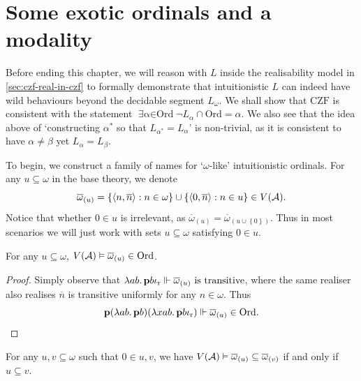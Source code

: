 \documentclass[12pt,openany]{book}
\theoremstyle{plain}
\theoremstyle{definition}
\newcommand\tuple[1]{\left\langle #1 \right\rangle}
\newcommand\opE[1]{\mathop{\exists #1}}
\newcommand\oplam[1]{\mathop{\lambda #1.}}
\newcommand\CZF{\mathrm{CZF}}
\newcommand\Ord{\mathrm{Ord}}
\newcommand\bp{\mathbf{p}}
\newcommand\ior{\iota_\textup{r}}
\begin{document}
\section{Some exotic ordinals and a modality}
\label{sec:ord-modal}

Before ending this chapter, we will reason with $L$ inside the realisability model in \autoref{sec:czf-real-in-czf} to formally demonstrate that intuitionistic $L$ can indeed have wild behaviours beyond the decidable segment $L_\omega$. We shall show that $\CZF$ is consistent with the statement $\opE{\alpha \in \Ord} \neg L_\alpha \cap \Ord = \alpha$. We also see that the idea above of `constructing $\alpha^*$ so that $L_{\alpha^*} = L_\alpha$' is non-trivial, as it is consistent to have $\alpha \neq \beta$ yet $L_\alpha = L_\beta$.

To begin, we construct a family of names for `$\omega$-like' intuitionistic ordinals. For any $u \subseteq \omega$ in the base theory, we denote
\[\overline{\omega}_{(u)} = \left\{\tuple{n, \overline{n}} : n \in \omega\right\} \cup \left\{\tuple{0, \overline{n}} : n \in u\right\} \in V\mleft(\mathcal{A}\mright).\]
Notice that whether $0 \in u$ is irrelevant, as $\overline{\omega}_{(u)} = \overline{\omega}_{(u \cup \left\{0\right\})}$. Thus in most scenarios we will just work with sets $u \subseteq \omega$ satisfying $0 \in u$.

\begin{lemma}
  \label{lem:exo-omega-is-ord}
  For any $u \subseteq \omega$, $V\mleft(\mathcal{A}\mright) \vDash \overline{\omega}_{(u)} \in \Ord$.
\end{lemma}

\begin{proof}
  Simply observe that $\oplam{ab} \bp b \ior \Vdash \text{$\overline{\omega}_{(u)}$ is transitive}$, where the same realiser also realises $\overline{n}$ is transitive uniformly for any $n \in \omega$. Thus
  \[\bp \mleft(\oplam{ab} \bp b\mright) \mleft(\oplam{xab} \bp b \ior\mright) \Vdash \overline{\omega}_{(u)} \in \Ord. \qedhere\]
\end{proof}

\begin{lemma}
  \label{lem:exo-omega-subset}
  For any $u, v \subseteq \omega$ such that $0 \in u, v$, we have $V\mleft(\mathcal{A}\mright) \vDash \overline{\omega}_{(u)} \subseteq \overline{\omega}_{(v)}$ if and only if $u \subseteq v$.
\end{lemma}
\end{document}

